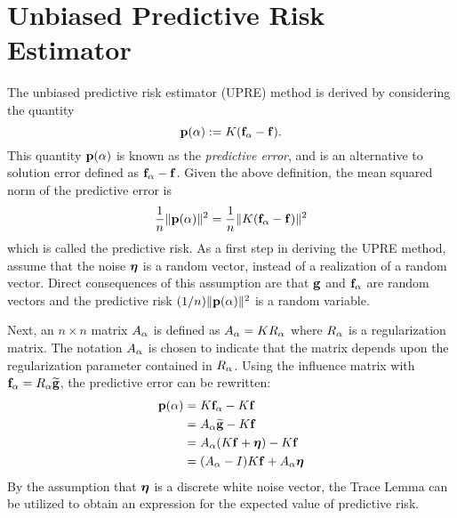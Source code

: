 \section{Unbiased Predictive Risk Estimator} \label{sec:Unbiased Predictive Risk Estimator}
The unbiased predictive risk estimator (UPRE) method \cite{Mallows1973} is derived by considering the quantity
\[\mathbf{p}(\alpha) := K(\mathbf{f}_{\alpha} - \mathbf{f}).\]
This quantity $\mathbf{p}(\alpha)$ is known as the \textit{predictive error}, and is an alternative to solution error defined as $\mathbf{f}_{\alpha} - \mathbf{f}$. Given the above definition, the mean squared norm of the predictive error is
\[\frac{1}{n}\|\mathbf{p}(\alpha)\|^2 = \frac{1}{n}\|K(\mathbf{f}_{\alpha} - \mathbf{f})\|^2\]
which is called the predictive risk.  As a first step in deriving the UPRE method, assume that the noise $\boldsymbol{\eta}$ is a random vector, instead of a realization of a random vector. Direct consequences of this assumption are that $\mathbf{g}$ and $\mathbf{f}_{\alpha}$ are random vectors and the predictive risk $(1/n)\|\mathbf{p}(\alpha)\|^2$ is a random variable. \par
Next, an $n \times n$ matrix $A_{\alpha}$ is defined as $A_{\alpha} = KR_{\alpha}$ where $R_{\alpha}$ is a regularization matrix. The notation $A_{\alpha}$ is chosen to indicate that the matrix depends upon the regularization parameter contained in $R_{\alpha}$. Using the influence matrix with $\mathbf{f}_{\alpha} = R_{\alpha}\widetilde{\mathbf{g}}$, the predictive error can be rewritten:
\begin{align*}
\mathbf{p}(\alpha) &= K\mathbf{f}_{\alpha} - K\mathbf{f} \\
&= A_{\alpha}\widetilde{\mathbf{g}} - K\mathbf{f} \\
&= A_{\alpha}(K\mathbf{f} + \boldsymbol{\eta}) - K\mathbf{f} \\
&= (A_{\alpha} - I)K\mathbf{f} + A_{\alpha}\boldsymbol{\eta}
\end{align*}
By the assumption that $\boldsymbol{\eta}$ is a discrete white noise vector, the Trace Lemma can be utilized to obtain an expression for the expected value of predictive risk.


